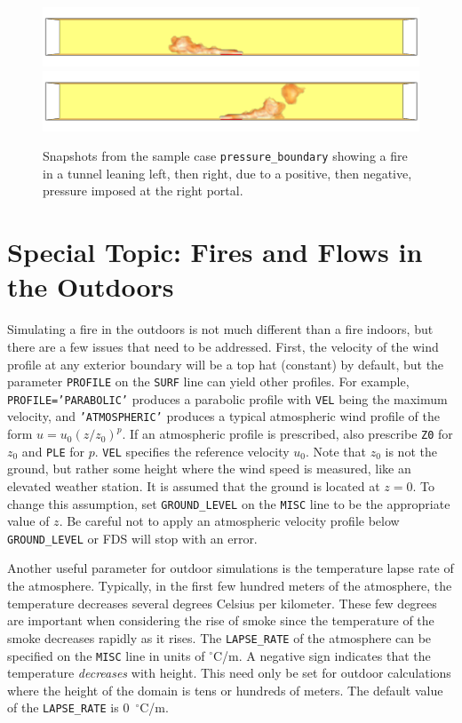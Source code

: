 \documentclass[11pt]{book}
\newcommand{\ct}{\tt\small}
\begin{document}
\begin{figure}[ht]
\includegraphics[width=\textwidth]{SCRIPT_FIGURES/pressure_boundary_left}
\includegraphics[width=\textwidth]{SCRIPT_FIGURES/pressure_boundary_right}
\caption[Snapshots of the {\ct pressure\_boundary} test case]{Snapshots from the sample case {\ct pressure\_boundary}
showing a fire in a tunnel leaning left, then right, due to a positive, then negative, pressure imposed at
the right portal.}
\label{pressure_boundary}
\end{figure}


\clearpage

\section{Special Topic: Fires and Flows in the Outdoors}
\label{info:stratification}

Simulating a fire in the outdoors is not much different than a fire
indoors, but there are a few issues that need to be addressed.
First, the velocity of the wind profile at any exterior boundary will be a top hat (constant) by default,
but the parameter {\ct PROFILE} on the {\ct SURF} line
can yield other profiles.
For example, {\ct PROFILE='PARABOLIC'} produces a parabolic profile with
{\ct VEL} being the maximum velocity,
and {\ct 'ATMOSPHERIC'} produces a typical atmospheric wind
profile of the form $u=u_0 (z/z_0)^p$. If an atmospheric profile is
prescribed, also prescribe {\ct Z0} for $z_0$  and {\ct PLE} for $p$.
{\ct VEL} specifies the reference velocity $u_0$. Note that $z_0$ is not the ground, but rather some
height where the wind speed is measured, like an elevated weather station. It is assumed that
the ground is located at $z=0$. To change this assumption, set {\ct GROUND\_LEVEL} on the {\ct MISC} line to be
the appropriate value of $z$. Be careful not to apply an atmospheric velocity profile below {\ct GROUND\_LEVEL} or
FDS will stop with an error.

Another useful parameter for outdoor simulations is the temperature
lapse rate of the atmosphere. Typically, in the first few hundred meters
of the atmosphere, the temperature decreases several degrees Celsius
per kilometer. These few degrees are important when considering the rise
of smoke since the temperature of the smoke decreases rapidly as it
rises. The {\ct LAPSE\_RATE} of the atmosphere can be specified on the
{\ct MISC} line in units of $^\circ$C/m. A negative sign indicates that the
temperature {\em decreases} with height.
This need only be set for outdoor calculations where the height of the
domain is tens or hundreds of meters.
The default value of the {\ct LAPSE\_RATE} is 0~$^\circ$C/m.
\end{document}

